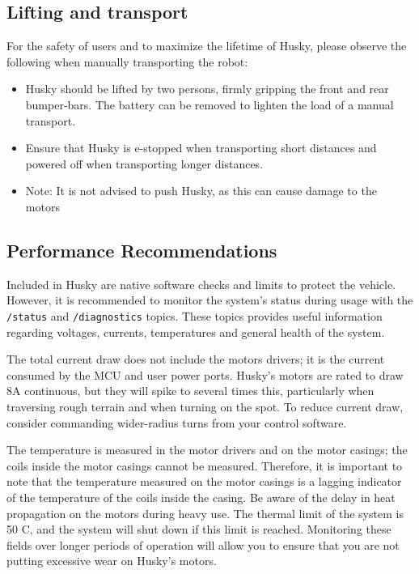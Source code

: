 \documentclass[]{clearpath-latex/clearpath-manual}
\begin{document}
\subsection{Lifting and transport}
For the safety of users and to maximize the lifetime of Husky, please observe the following when manually transporting the robot:

\begin{itemize}
		\item Husky should be lifted by two persons, firmly gripping the front and rear bumper-bars. 
		The battery can be removed to lighten the load of a manual transport.
		\item Ensure that Husky is e-stopped when transporting short distances and powered off when transporting 
		longer distances.
		\item Note: It is not advised to push Husky, as this can cause damage to the motors
\end{itemize}
\newpage
	
\subsection{Performance Recommendations}

Included in Husky are native software checks and limits to protect the vehicle. However, 
it is recommended to monitor the system’s status during usage with the \lstinline{/status} and \lstinline{/diagnostics} topics. 
These topics provides useful information regarding voltages, currents, temperatures and general health of the system.

The total current draw does not include the motors drivers; it is the current consumed by the MCU and user power ports. 
Husky’s motors are rated to draw 8A continuous, but they will spike to several times this, particularly when traversing 
rough terrain and when turning on the spot. To reduce current draw, consider commanding wider-radius turns from 
your control software.

The temperature is measured in the motor drivers and on the motor casings; the coils inside the motor casings cannot be measured.
Therefore, it is important to note that the temperature measured on the motor casings is a lagging indicator of 
the temperature of the coils inside the casing. Be aware of the delay in heat propagation on the motors during heavy use. 
The thermal limit of the system is 50 C\degree, and the system will shut down if this limit is reached.
Monitoring these fields over longer periods of operation will allow you to ensure that you are not putting 
excessive wear on Husky's motors.
\newpage
\end{document}
